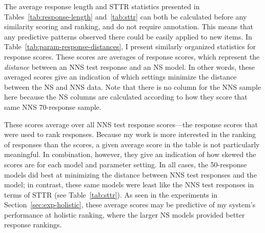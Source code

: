 The average response length and STTR statistics presented in Tables~\ref{tab:response-length} and~\ref{tab:sttr} can both be calculated before any similarity scoring and ranking, and do not require annotation. This means that any predictive patterns observed there could be easily applied to new items. In Table~\ref{tab:param-response-distances}, I present similarly organized statistics for response scores. These scores are averages of response scores, which represent the \textit{distance} between an NNS test response and an NS model. In other words, these averaged scores give an indication of which settings minimize the distance between the NS and NNS data. Note that there is no column for the NNS sample here because the NS columns are calculated according to how they score that same NNS 70-response sample.

These scores average over all NNS test response scores---the response scores that were used to rank responses. Because my work is more interested in the ranking of responses than the scores, a given average score in the table is not particularly meaningful. In combination, however, they give an indication of how skewed the scores are for each model and parameter setting. In all cases, the 50-response  models did best at minimizing the distance between NNS test responses and the model; in contrast, these same models were least like the NNS test responses in terms of STTR (see Table~\ref{tab:sttr}). As seen in the experiments in Section~\ref{sec:exp-holistic}, these average scores may be predictive of my system's performance at holistic ranking, where the larger NS models provided better response rankings.


